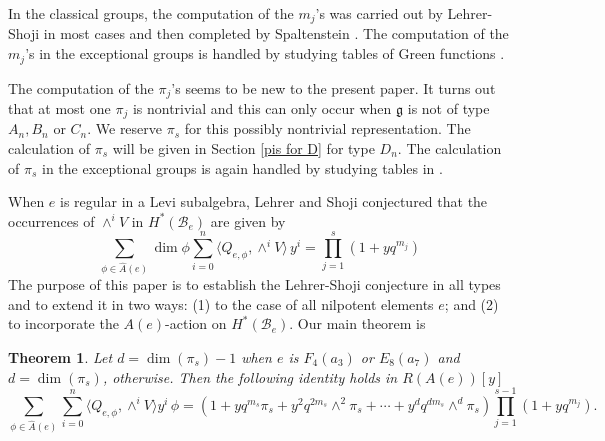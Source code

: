\documentclass[10pt]{amsart}
\newcommand{\g}{\mathfrak{g}}
\newcommand{\ar}{{\hat{A}}(e)}
\newcommand{\flag}{{\mathcal B}}
\theoremstyle{plain}
\newtheorem{theorem}{Theorem}
\theoremstyle{definition}
\theoremstyle{remark}
\begin{document}

In the classical groups, the computation of the $m_j$'s 
was carried out by Lehrer-Shoji \cite{lehrer-shoji:reflections} in most cases and then completed by Spaltenstein \cite{spaltenstein:reflection}. 
The computation of the $m_j$'s in the exceptional groups is handled by studying tables of Green functions \cite{bs:green}.

The computation of the $\pi_j$'s seems to be new to the present paper.  
It turns out that at most one $\pi_j$ is nontrivial and 
this can only occur when $\g$ is not of type $A_n, B_n$ or $C_n$.   
We reserve $\pi_s$ for this possibly nontrivial representation.
The calculation of $\pi_s$ will be given in Section \ref{pis for D} for type $D_n$.   The calculation of
$\pi_s$ in the exceptional groups is again handled by studying tables in \cite{bs:green}.

When $e$ is regular in a Levi subalgebra, Lehrer and Shoji \cite{lehrer-shoji:reflections}
conjectured that the occurrences of $\wedge^i V$ in $H^*(\flag_e)$ are given by 
\begin{equation}\label{ls_conj}
\sum_{\phi \in \ar}  \dim \phi \sum_{i=0}^{n}  \langle Q_{e, \phi}, \wedge^i V \rangle \, y^i = \prod_{j=1}^{s} (1+yq^{m_j})
\end{equation}
The purpose of this paper is to establish the Lehrer-Shoji conjecture in all types and to extend it in two ways:  (1) to the case of all 
nilpotent elements $e$; and (2) to incorporate the $A(e)$-action on $H^*(\flag_e)$.   
Our main theorem is
  
\begin{theorem} \label{weaker_theorem}
Let $d = \dim(\pi_s)-1$ when $e$ is $F_4(a_3)$ or $E_8(a_7)$ and $d = \dim(\pi_s)$, otherwise.
Then the following identity holds in $R(A(e))[y]$
\begin{equation*} 
\sum_{\phi \in \ar} \sum_{i=0}^{n} \langle Q_{e, \phi}, \wedge^i V \rangle y^i \, \phi=  (1 + yq^{m_s}\pi_s + y^2 q^{2m_s}\!\wedge^2 \! \pi_s + \cdots + y^d q^{dm_s} \! \wedge^d \! \pi_s) \prod_{j=1}^{s-1} (1+yq^{m_j}).
\end{equation*}
\end{theorem}
\end{document}
